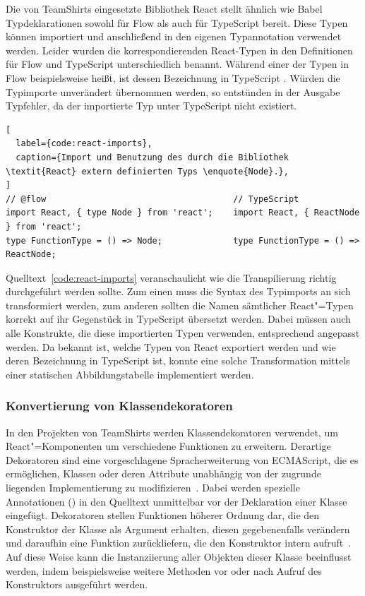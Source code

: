 Die von TeamShirts eingesetzte Bibliothek React stellt ähnlich wie Babel Typdeklarationen sowohl für Flow als auch für TypeScript bereit. Diese Typen können importiert und anschließend in den eigenen Typannotation verwendet werden. Leider wurden die korrespondierenden React-Typen in den Definitionen für Flow und TypeScript unterschiedlich benannt. Während einer der Typen in Flow beispielsweise  heißt, ist dessen Bezeichnung in TypeScript . Würden die Typimporte unverändert übernommen werden, so entstünden in der Ausgabe Typfehler, da der importierte Typ unter TypeScript nicht existiert.

\begin{lstlisting}[
  label={code:react-imports},
  caption={Import und Benutzung des durch die Bibliothek \textit{React} extern definierten Typs \enquote{Node}.},
]
// @flow                                     // TypeScript
import React, { type Node } from 'react';    import React, { ReactNode } from 'react';
type FunctionType = () => Node;              type FunctionType = () => ReactNode;
\end{lstlisting}

Quelltext~\ref{code:react-imports} veranschaulicht wie die Transpilierung richtig durchgeführt werden sollte. Zum einen muss die Syntax des Typimports an sich transformiert werden, zum anderen sollten die Namen sämtlicher React"=Typen korrekt auf ihr Gegenstück in TypeScript übersetzt werden. Dabei müssen auch alle Konstrukte, die diese importierten Typen verwenden, entsprechend angepasst werden. Da bekannt ist, welche Typen von React exportiert werden und wie deren Bezeichnung in TypeScript ist, konnte eine solche Transformation mittels einer statischen Abbildungstabelle implementiert werden.

\subsubsection{Konvertierung von Klassendekoratoren}
\label{sec:class-decorators}

In den Projekten von TeamShirts werden Klassendekoratoren verwendet, um React"=Komponenten um verschiedene Funktionen zu erweitern. Derartige Dekoratoren sind eine vorgeschlagene Spracherweiterung von ECMAScript, die es ermöglichen, Klassen oder deren Attribute unabhängig von der zugrunde liegenden Implementierung zu modifizieren~\autocite{ES_PROPOSAL:DECORATORS}. Dabei werden spezielle Annotationen () in den Quelltext unmittelbar vor der Deklaration einer Klasse eingefügt. Dekoratoren stellen Funktionen höherer Ordnung dar, die den Konstruktor der Klasse als Argument erhalten, diesen gegebenenfalls verändern und daraufhin eine Funktion zurückliefern, die den Konstruktor intern aufruft~\autocite{ES_PROPOSAL:DECORATORS}. Auf diese Weise kann die Instanziierung aller Objekten dieser Klasse beeinflusst werden, indem beispielsweise weitere Methoden vor oder nach Aufruf des Konstruktors ausgeführt werden.

